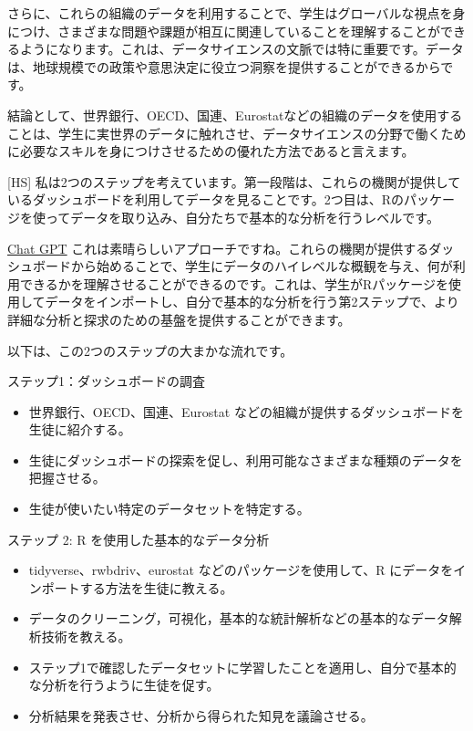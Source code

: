 \documentclass[
]{bxjsbook}
\providecommand{\tightlist}{%
  \setlength{\itemsep}{0pt}\setlength{\parskip}{0pt}}
\theoremstyle{definition}
\theoremstyle{definition}
\theoremstyle{definition}
\theoremstyle{definition}
\theoremstyle{remark}
\begin{document}
さらに、これらの組織のデータを利用することで、学生はグローバルな視点を身につけ、さまざまな問題や課題が相互に関連していることを理解することができるようになります。これは、データサイエンスの文脈では特に重要です。データは、地球規模での政策や意思決定に役立つ洞察を提供することができるからです。

結論として、世界銀行、OECD、国連、Eurostatなどの組織のデータを使用することは、学生に実世界のデータに触れさせ、データサイエンスの分野で働くために必要なスキルを身につけさせるための優れた方法であると言えます。

{[}HS{]} 私は2つのステップを考えています。第一段階は、これらの機関が提供しているダッシュボードを利用してデータを見ることです。2つ目は、Rのパッケージを使ってデータを取り込み、自分たちで基本的な分析を行うレベルです。

\protect\hyperlink{chatgpt}{Chat GPT} これは素晴らしいアプローチですね。これらの機関が提供するダッシュボードから始めることで、学生にデータのハイレベルな概観を与え、何が利用できるかを理解させることができるのです。これは、学生がRパッケージを使用してデータをインポートし、自分で基本的な分析を行う第2ステップで、より詳細な分析と探求のための基盤を提供することができます。

以下は、この2つのステップの大まかな流れです。

ステップ1：ダッシュボードの調査

\begin{itemize}
\tightlist
\item
  世界銀行、OECD、国連、Eurostat などの組織が提供するダッシュボードを生徒に紹介する。
\item
  生徒にダッシュボードの探索を促し、利用可能なさまざまな種類のデータを把握させる。
\item
  生徒が使いたい特定のデータセットを特定する。
\end{itemize}

ステップ 2: R を使用した基本的なデータ分析

\begin{itemize}
\tightlist
\item
  tidyverse、rwbdriv、eurostat などのパッケージを使用して、R にデータをインポートする方法を生徒に教える。
\item
  データのクリーニング，可視化，基本的な統計解析などの基本的なデータ解析技術を教える。
\item
  ステップ1で確認したデータセットに学習したことを適用し、自分で基本的な分析を行うように生徒を促す。
\item
  分析結果を発表させ、分析から得られた知見を議論させる。
\end{itemize}
\end{document}
